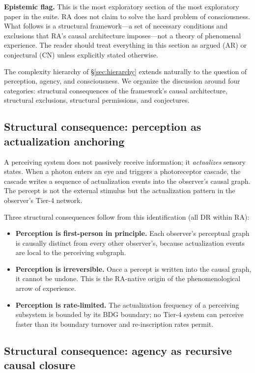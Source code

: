\documentclass[11pt]{article}
\begin{document}
\textbf{Epistemic flag.} This is the most exploratory section of the most exploratory paper in the suite. RA does not claim to solve the hard problem of consciousness. What follows is a structural framework---a set of necessary conditions and exclusions that RA's causal architecture imposes---not a theory of phenomenal experience. The reader should treat everything in this section as argued (AR) or conjectural (CN) unless explicitly stated otherwise.

The complexity hierarchy of \S\ref{sec:hierarchy} extends naturally to the question of perception, agency, and consciousness. We organize the discussion around four categories: structural consequences of the framework's causal architecture, structural exclusions, structural permissions, and conjectures.

\subsection{Structural consequence: perception as actualization anchoring}

A perceiving system does not passively receive information; it \emph{actualizes} sensory states. When a photon enters an eye and triggers a photoreceptor cascade, the cascade writes a sequence of actualization events into the observer's causal graph. The percept is not the external stimulus but the actualization pattern in the observer's Tier-4 network.

Three structural consequences follow from this identification (all DR within RA):
\begin{itemize}[nosep]
\item \textbf{Perception is first-person in principle.} Each observer's perceptual graph is causally distinct from every other observer's, because actualization events are local to the perceiving subgraph.
\item \textbf{Perception is irreversible.} Once a percept is written into the causal graph, it cannot be undone. This is the RA-native origin of the phenomenological arrow of experience.
\item \textbf{Perception is rate-limited.} The actualization frequency of a perceiving subsystem is bounded by its BDG boundary; no Tier-4 system can perceive faster than its boundary turnover and re-inscription rates permit.
\end{itemize}

\subsection{Structural consequence: agency as recursive causal closure}
\end{document}
